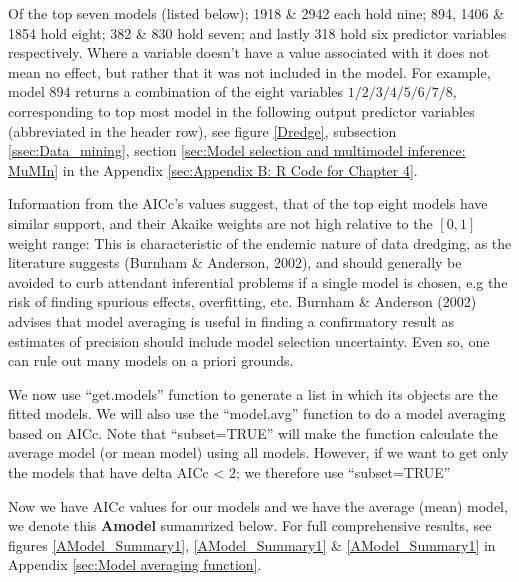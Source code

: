 \documentclass{DissertateUSU}
\begin{document}
Of the top seven models (listed below); 1918 \& 2942 each hold nine;
894, 1406 \& 1854 hold eight; 382 \& 830 hold seven; and lastly 318 hold
six predictor variables respectively. Where a variable doesn't have a
value associated with it does not mean no effect, but rather that it was
not included in the model. For example, model \(894\) returns a
combination of the eight variables \(1/2/3/4/5/6/7/8\), corresponding to
top most model in the following output predictor variables (abbreviated
in the header row), see figure \ref{Dredge}, subsection
\ref{ssec:Data_mining}, section
\ref{sec:Model selection and multimodel inference: MuMIn} in the
Appendix \ref{sec:Appendix B: R Code for Chapter 4}.\medskip

Information from the AICc's values suggest, that of the top eight models
have similar support, and their Akaike weights are not high relative to
the \([0,1]\) weight range: This is characteristic of the endemic nature
of data dredging, as the literature suggests (Burnham \& Anderson,
2002), and should generally be avoided to curb attendant inferential
problems if a single model is chosen, e.g the risk of finding spurious
effects, overfitting, etc. Burnham \& Anderson (2002) advises that model
averaging is useful in finding a confirmatory result as estimates of
precision should include model selection uncertainty. Even so, one can
rule out many models on a priori grounds.\medskip    

We now use ``get.models'' function to generate a list in which its
objects are the fitted models. We will also use the ``model.avg''
function to do a model averaging based on AICc. Note that
``subset=TRUE'' will make the function calculate the average model (or
mean model) using all models. However, if we want to get only the models
that have delta AICc \textless{} 2; we therefore use ``subset=TRUE''

\singlespacing

\doublespacing

Now we have AICc values for our models and we have the average (mean)
model, we denote this \textbf{Amodel} sumamrized below. For full
comprehensive results, see figures \ref{AModel_Summary1},
\ref{AModel_Summary1} \& \ref{AModel_Summary1} in Appendix
\ref{sec:Model averaging function}. \medskip
\end{document}
